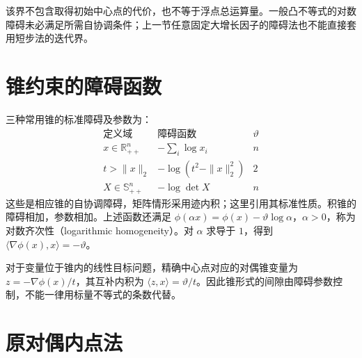 \documentclass[UTF8,12pt,a4paper,fontset=fandol]{ctexbook}
\begin{document}
该界不包含取得初始中心点的代价，也不等于浮点总运算量。一般凸不等式的对数障碍未必满足所需自协调条件；上一节任意固定大增长因子的障碍法也不能直接套用短步法的迭代界。

\section{锥约束的障碍函数}

三种常用锥的标准障碍及参数为：
\[
 \begin{array}{c|c|c}
 \text{定义域}&\text{障碍函数}&\vartheta\\\hline
 x\in\mathbb R_{++}^n&-\sum_i\log x_i&n\\
 t>\|x\|_2&-\log(t^2-\|x\|_2^2)&2\\
 X\in\mathbb S_{++}^n&-\log\det X&n
 \end{array}
\]
这些是相应锥的自协调障碍，矩阵情形采用迹内积；这里引用其标准性质。积锥的障碍相加，参数相加。上述函数还满足 $\phi(\alpha x)=\phi(x)-\vartheta\log\alpha$，$\alpha>0$，称为对数齐次性（logarithmic homogeneity）。对 $\alpha$ 求导于 $1$，得到 $\langle\nabla\phi(x),x\rangle=-\vartheta$。

对于变量位于锥内的线性目标问题，精确中心点对应的对偶锥变量为 $z=-\nabla\phi(x)/t$，其互补内积为 $\langle z,x\rangle=\vartheta/t$。因此锥形式的间隙由障碍参数控制，不能一律用标量不等式的条数代替。

\section{原对偶内点法}
\end{document}
